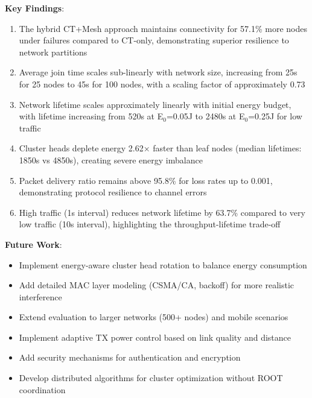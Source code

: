 \documentclass[conference]{IEEEtran}
\begin{document}
\textbf{Key Findings}:
\begin{enumerate}
    \item The hybrid CT+Mesh approach maintains connectivity for 57.1\% more nodes under failures compared to CT-only, demonstrating superior resilience to network partitions
    \item Average join time scales sub-linearly with network size, increasing from 25s for 25 nodes to 45s for 100 nodes, with a scaling factor of approximately 0.73
    \item Network lifetime scales approximately linearly with initial energy budget, with lifetime increasing from 520s at E$_0$=0.05J to 2480s at E$_0$=0.25J for low traffic
    \item Cluster heads deplete energy 2.62× faster than leaf nodes (median lifetimes: 1850s vs 4850s), creating severe energy imbalance
    \item Packet delivery ratio remains above 95.8\% for loss rates up to 0.001, demonstrating protocol resilience to channel errors
    \item High traffic (1s interval) reduces network lifetime by 63.7\% compared to very low traffic (10s interval), highlighting the throughput-lifetime trade-off
\end{enumerate}

\textbf{Future Work}:
\begin{itemize}
    \item Implement energy-aware cluster head rotation to balance energy consumption
    \item Add detailed MAC layer modeling (CSMA/CA, backoff) for more realistic interference
    \item Extend evaluation to larger networks (500+ nodes) and mobile scenarios
    \item Implement adaptive TX power control based on link quality and distance
    \item Add security mechanisms for authentication and encryption
    \item Develop distributed algorithms for cluster optimization without ROOT coordination
\end{itemize}
\end{document}
